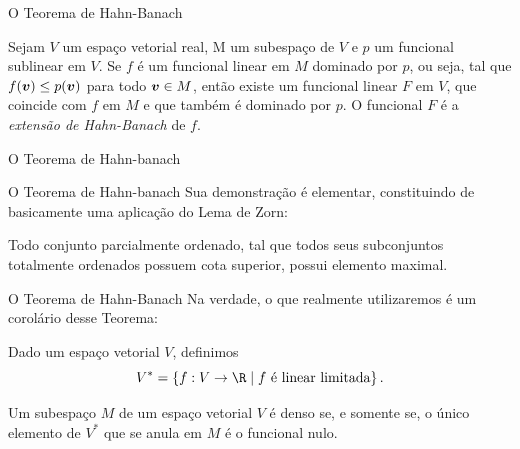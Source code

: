 \documentclass[13pt]{beamer}
\begin{document}
\begin{frame}{O Teorema de Hahn-Banach}
    \begin{teo*}
        Sejam \( V \) um espaço vetorial real, M um subespaço de \( V \) e \( p \) um funcional sublinear em \( V \).
        Se \( f \) é um funcional linear em \( M \) dominado por \( p \), ou seja, tal que \( f ( \bm{v} ) \leq p ( \bm{v} ) \) para todo \( \bm{v} \in M \), então existe um funcional linear \( F \) em \( V \), que coincide com \( f \) em \( M \) e que também é dominado por \( p \). O funcional \( F \) é a \emph{extensão de Hahn-Banach} de \( f \).
    \end{teo*}
\end{frame}

\begin{frame}{O Teorema de Hahn-banach}
\end{frame}


\begin{frame}{O Teorema de Hahn-banach}
    Sua demonstração é elementar, constituindo de basicamente uma aplicação do Lema de Zorn:
    \begin{axiom}
        Todo conjunto parcialmente ordenado, tal que todos seus subconjuntos totalmente ordenados possuem cota superior, possui elemento maximal.
    \end{axiom}
\end{frame}


\begin{frame}{O Teorema de Hahn-Banach}
    Na verdade, o que realmente utilizaremos é um corolário desse Teorema:
    \begin{defn*}
        Dado um espaço vetorial \( V \), definimos
        \begin{equation*}
            V^{ * } = \left\{ f : V \to \R \mid f \text{ é linear limitada} \right\}
        .\end{equation*}
    \end{defn*}
    \begin{cor*}
        Um subespaço \( M \) de um espaço vetorial \( V \) é denso se, e somente se, o único elemento de \( V^{ * } \) que se anula em \( M \) é o funcional nulo.
    \end{cor*}
\end{frame}

\end{document}

